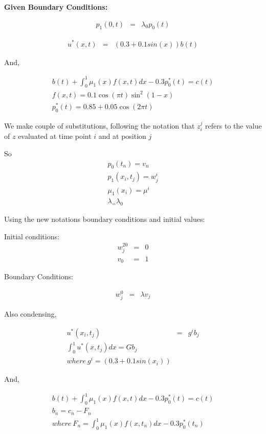 \documentclass{ifacconf}
\begin{document}
\textbf{Given Boundary Conditions:}

\begin{eqnarray}
p_1(0,t) &=& \lambda_0 p_0(t)
\end{eqnarray}

\begin{eqnarray}
u^{*}(x,t) &=& (0.3+0.1 sin(x))b(t) 
\end{eqnarray}

And,

\begin{eqnarray}
b(t)+\int_0^1\mu_1(x)f(x,t)dx -0.3p_0^{*}(t) = c(t)\\
f(x,t) = 0.1\cos(\pi t)\sin^2(1-x)\\
p_0^{*}(t) = 0.85+0.05\cos(2\pi t)
\end{eqnarray}



We make couple of substitutions, following the notation that
$z_i^j$ refers to the value of $z$ evaluated at time point $i$ and at position $j$

So 
\begin{eqnarray}
p_0(t_n) = v_n \nonumber \\
p_1(x_i,t_j) = w_j^i \\
\mu_1(x_i) = \mu^i \\
\lambda_ = \lambda_0
\end{eqnarray} 


Using the new notations boundary conditions and initial values:


Initial conditions:
\begin{eqnarray}
w_j^{20} &=& 0\\
v_0 &=& 1
\end{eqnarray}

Boundary Conditions:

\begin{eqnarray}
w_j^0 &=&  \lambda v_j
\end{eqnarray}

Also condensing,


\begin{eqnarray}
u^{*}(x_i,t_j) &=& g^ib_j \\
\int_0^1 u^{*}(x,t_j)dx = Gb_j\\
where\ g^i = (0.3+0.1sin(x_i)) \nonumber
\end{eqnarray}

And,

\begin{eqnarray}
b(t)+\int_0^1\mu_1(x)f(x,t)dx -0.3p_0^{*}(t) = c(t) \nonumber \\
b_n = c_n - F_n \\
where\ F_n = \int_0^1\mu_1(x)f(x,t_n)dx -0.3p_0^{*}(t_n)\\
\end{eqnarray}
\end{document}
